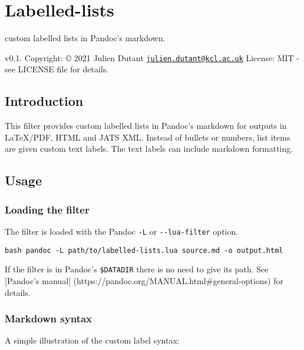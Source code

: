 \hypertarget{labelled-lists}{%
\section{Labelled-lists}\label{labelled-lists}}

custom labelled lists in Pandoc's markdown.

v0.1. Copyright: © 2021 Julien Dutant
\href{mailto:julien.dutant@kcl.ac.uk}{\nolinkurl{julien.dutant@kcl.ac.uk}}
License: MIT - see LICENSE file for details.

\hypertarget{introduction}{%
\subsection{Introduction}\label{introduction}}

This filter provides custom labelled lists in Pandoc's markdown for
outputs in LaTeX/PDF, HTML and JATS XML. Instead of bullets or numbers,
list items are given custom text labels. The text labels can include
markdown formatting.

\hypertarget{usage}{%
\subsection{Usage}\label{usage}}

\hypertarget{loading-the-filter}{%
\subsubsection{Loading the filter}\label{loading-the-filter}}

The filter is loaded with the Pandoc \texttt{-L} or
\texttt{-\/-lua-filter} option.

\texttt{bash\ pandoc\ -L\ path/to/labelled-lists.lua\ source.md\ -o\ output.html}

If the filter is in Pandoc's \texttt{\$DATADIR} there is no need to give
its path. See {[}Pandoc's manual{[}
(https://pandoc.org/MANUAL.html\#general-options) for details.

\hypertarget{markdown-syntax}{%
\subsubsection{Markdown syntax}\label{markdown-syntax}}

A simple illustration of the custom label syntax:

\begin{Shaded}
\begin{Highlighting}[]
\SpecialStringTok{* }\CommentTok{[}\CommentTok{]}
\SpecialStringTok{* }\CommentTok{[}\CommentTok{]}
\SpecialStringTok{* }\CommentTok{[}\CommentTok{]}
\end{Highlighting}
\end{Shaded}

